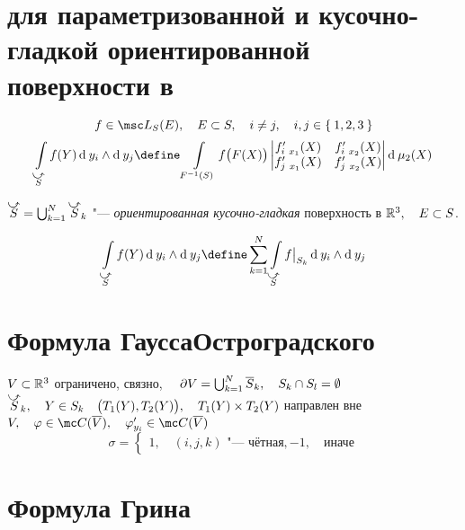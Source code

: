 \section{ для параметризованной и кусочно-гладкой ориентированной поверхности в }

\begin{definition}
	$$ f \in \msc L_S(E), \quad E \sub S, \quad i \ne j, \quad i, j \in \set{1, 2, 3} $$
	$$ \int\limits_{\curvedir S} f(Y) \di y_i \wedge \di y_j \define \int\limits_{F^{-1}(S)} f \bigl(F(X) \bigr)
	\begin{vmatrix}
		f_{i~x_1}'(X) & f_{i~x_2}'(X) \\
		f_{j~x_1}'(X) & f_{j~x_2}'(X)
	\end{vmatrix} \di \mu_2(X) $$
\end{definition}

\begin{definition}
	$ \curvedir S = \bigcup_{k = 1}^N \curvedir S_k $ "--- \emph{ориентированная кусочно-гладкая} поверхность в $ \mathbb{R}^3, \quad E \subset S $.
	
	$$ \int\limits_{\curvedir S} f(Y) \di y_i \wedge \di y_j \define \sum_{k = 1}^N \int\limits_{\curvedir S} f\big|_{S_k}\di y_i \wedge \di y_j $$
\end{definition}

\section{Формула ГауссаОстроградского}

\begin{theorem}
	$ V \subset \mathbb{R}^3 $ ограничено, связно, $ \quad \partial V = \bigcup_{k = 1}^N \overline S_k, \quad S_k \cap S_l = \emptyset $ \\
	$ \curvedir S_k, \quad Y \in S_k \quad \bigl( T_1(Y), T_2(Y) \bigr), \quad T_1(Y) \times T_2(Y) $ направлен вне $ V, \quad \phi \in \mc C(\ol V), \quad \phi_{y_i}' \in \mc C(\ol V) $
	$$ \sigma =
	\begin{cases}
		1, \quad (i, j, k) \text{ "--- чётная},
		-1, \quad \text{иначе}
	\end{cases} $$
\end{theorem}

\section{Формула Грина}

